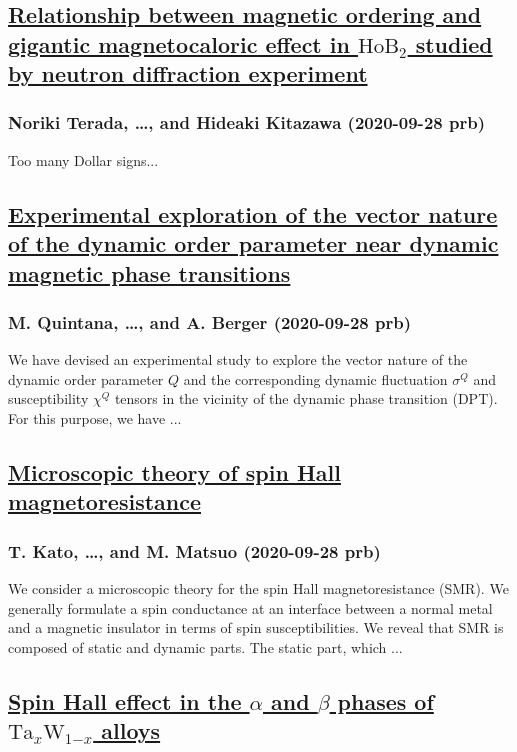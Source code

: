 \subsection*{\href{http://link.aps.org/doi/10.1103/PhysRevB.102.094435}{Relationship between magnetic ordering and gigantic magnetocaloric effect in ${\mathrm{HoB}}_{2}$ studied by neutron diffraction experiment}}
\subsubsection*{Noriki Terada, \dots, and Hideaki Kitazawa (2020-09-28 prb)}
Too many Dollar signs...
\subsection*{\href{http://link.aps.org/doi/10.1103/PhysRevB.102.094436}{Experimental exploration of the vector nature of the dynamic order parameter near dynamic magnetic phase transitions}}
\subsubsection*{M. Quintana, \dots, and A. Berger (2020-09-28 prb)}
We have devised an experimental study to explore the vector nature of the dynamic order parameter       $Q$   and the corresponding dynamic fluctuation ${{σ}}^{Q}$ and susceptibility ${{χ}}^{Q}$ tensors in the vicinity of the dynamic phase transition (DPT). For this purpose, we have ...
\subsection*{\href{http://link.aps.org/doi/10.1103/PhysRevB.102.094437}{Microscopic theory of spin Hall magnetoresistance}}
\subsubsection*{T. Kato, \dots, and M. Matsuo (2020-09-28 prb)}
We consider a microscopic theory for the spin Hall magnetoresistance (SMR). We generally formulate a spin conductance at an interface between a normal metal and a magnetic insulator in terms of spin susceptibilities. We reveal that SMR is composed of static and dynamic parts. The static part, which ...
\subsection*{\href{http://link.aps.org/doi/10.1103/PhysRevB.102.094438}{Spin Hall effect in the $α$ and $β$ phases of $\mathrm{T}{\mathrm{a}}_{x}{\mathrm{W}}_{1\text{−}x}$ alloys}}
